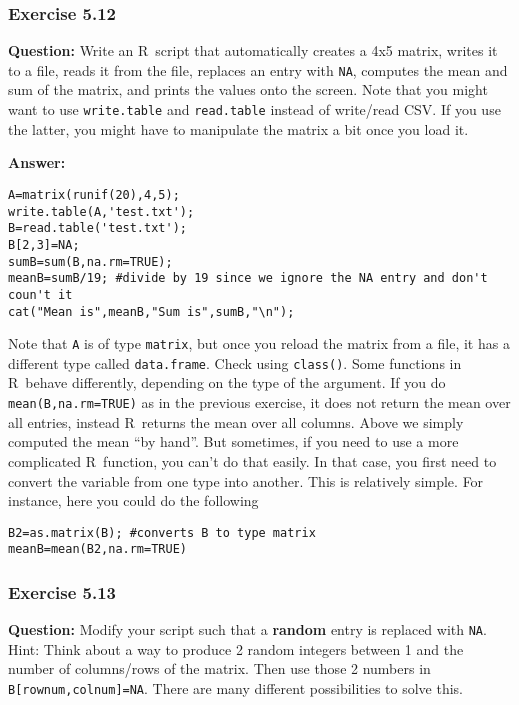 \documentclass [11pt]{article}
\newcommand{\code}[1]{{\tt #1}}
\newcommand\R{{\sf R}}
\begin{document}
\subsubsection*{Exercise 5.12}
\textbf{Question:}
Write an \R\ script that automatically creates a 4x5 matrix, writes it to a file, reads it from the file, replaces an entry with \code{NA}, computes the mean and sum of the matrix, and prints the values onto the screen. Note that you might want to use \code{write.table} and \code{read.table} instead of write/read CSV. If you use the latter, you might have to manipulate the matrix a bit once you load it.


\textbf{Answer:}
\begin{verbatim}
A=matrix(runif(20),4,5);
write.table(A,'test.txt');
B=read.table('test.txt');
B[2,3]=NA;
sumB=sum(B,na.rm=TRUE);
meanB=sumB/19; #divide by 19 since we ignore the NA entry and don't coun't it
cat("Mean is",meanB,"Sum is",sumB,"\n");
\end{verbatim}
Note that \code{A} is of type \code{matrix}, but once you reload the matrix from a file, it has a different type called \code{data.frame}. Check using \code{class()}. Some functions in \R\ behave differently, depending on the type of the argument. If you do \code{mean(B,na.rm=TRUE)} as in the previous exercise, it does not return the mean over all entries, instead \R\ returns the mean over all columns. Above we simply computed the mean ``by hand''. But sometimes, if you need to use a more complicated \R\ function, you can't do that easily. In that case, you first need to convert the variable from one type into another. This is relatively simple. For instance, here you could do the following
\begin{verbatim}
B2=as.matrix(B); #converts B to type matrix
meanB=mean(B2,na.rm=TRUE)
\end{verbatim}
 

\subsubsection*{Exercise 5.13}
\textbf{Question:}
Modify your script such that a {\bf random} entry is replaced with \code{NA}. Hint: Think about a way to produce 2 random integers between 1 and the number of columns/rows of the matrix. Then use those 2 numbers in \code{B[rownum,colnum]=NA}. There are many different possibilities to solve this.
\end{document}
